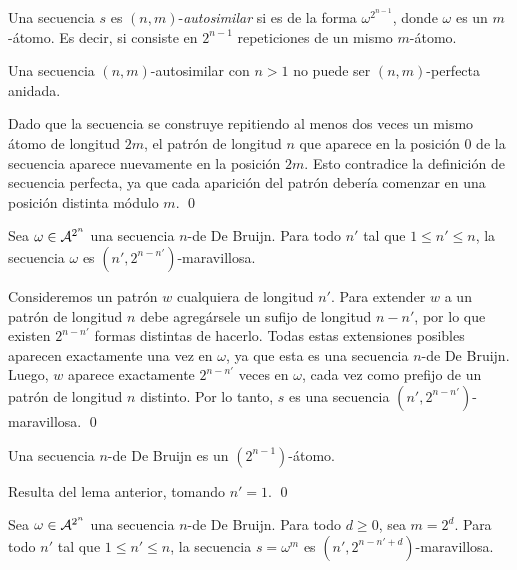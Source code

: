 \begin{defi}
  Una secuencia $s$ es $(n,m)$-\emph{autosimilar} si es de la forma
  $\omega^{2^{n-1}}$, donde $\omega$ es un $m$-átomo. Es decir, si consiste
  en $2^{n-1}$ repeticiones de un mismo $m$-átomo.
\end{defi}

\begin{lema}
  \label{lema:autosimilar-cannot-be-np}
  Una secuencia $(n,m)$-autosimilar con $n > 1$ no puede ser $(n,m)$-perfecta
  anidada.
\end{lema}

\begin{demo}
  Dado que la secuencia se construye repitiendo al menos dos veces un mismo
  átomo de longitud $2m$, el patrón de longitud $n$ que aparece en la posición
  $0$ de la secuencia aparece nuevamente en la posición $2m$. Esto contradice
  la definición de secuencia perfecta, ya que cada aparición del patrón debería
  comenzar en una posición distinta módulo $m$. \qed
\end{demo}

\begin{lema}
  Sea $\omega \in \mathcal{A}^{2^n}$ una secuencia $n$-de De Bruijn. Para todo
  $n'$ tal que $1 \leq n' \leq n$, la secuencia $\omega$ es
  $(n',2^{n-n'})$-maravillosa.
\end{lema}

\begin{demo}
  Consideremos un patrón $w$ cualquiera de longitud $n'$. Para extender $w$ a
  un patrón de longitud $n$ debe agregársele un sufijo de longitud $n-n'$, por
  lo que existen $2^{n-n'}$ formas distintas de hacerlo. Todas estas
  extensiones posibles aparecen exactamente una vez en $\omega$, ya que esta es
  una secuencia $n$-de De Bruijn. Luego, $w$ aparece exactamente $2^{n-n'}$
  veces en $\omega$, cada vez como prefijo de un patrón de longitud $n$
  distinto. Por lo tanto, $s$ es una secuencia $(n',2^{n-n'})$-maravillosa.
  \qed
\end{demo}

\begin{coro}
  Una secuencia $n$-de De Bruijn es un $(2^{n-1})$-átomo.
\end{coro}

\begin{demo}
  Resulta del lema anterior, tomando $n' = 1$. \qed
\end{demo}

\begin{lema}
  Sea $\omega \in \mathcal{A}^{2^n}$ una secuencia $n$-de De Bruijn. Para todo
  $d \geq 0$, sea $m = 2^d$. Para todo $n'$ tal que $1 \leq n' \leq n$, la
  secuencia $s = \omega^{m}$ es $(n',2^{n-n'+d})$-maravillosa.
\end{lema}

